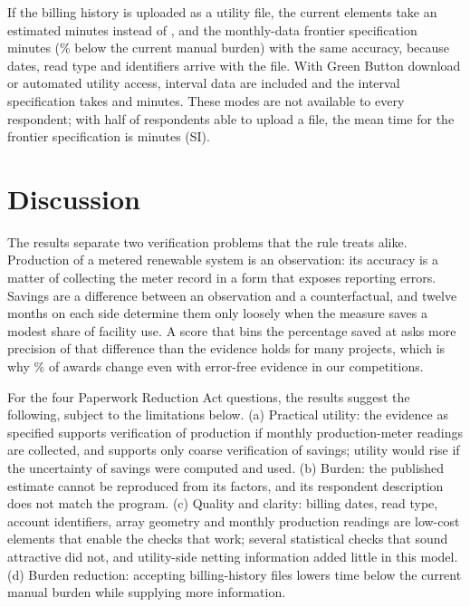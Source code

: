 \documentclass[preprint,12pt]{elsarticle}
\begin{document}
If the billing history is uploaded as a utility file, the current elements take an
estimated \ModeCurrentUploadBurden{} minutes instead of \ModeCurrentManualBurden, and the
monthly-data frontier specification \ModeRecUploadBurden{} minutes
(\ModeRecUploadVsCurrentPct\% below the current manual burden) with the same accuracy,
because dates, read type and identifiers arrive with the file. With Green Button
download \cite{naesbreq21espi} or automated utility access, interval data are included
and the interval specification takes \ModeRecIntervalGreenButtonBurden{} and
\ModeRecIntervalAutomatedBurden{} minutes. These modes are not available to every
respondent; with half of respondents able to upload a file, the mean time for the
frontier specification is \ModeRecUploadHalfBurden{} minutes (SI).

\section{Discussion}

The results separate two verification problems that the rule treats alike. Production of
a metered renewable system is an observation: its accuracy is a matter of collecting the
meter record in a form that exposes reporting errors. Savings are a difference between
an observation and a counterfactual, and twelve months on each side determine them only
loosely when the measure saves a modest share of facility use. A score that bins the
percentage saved at \EeiBandEdges{} asks more precision of that
difference than the evidence holds for many projects, which is why
\SelCurrentCleanMid\% of awards change even with error-free evidence in our competitions.

For the four Paperwork Reduction Act questions, the results suggest the following,
subject to the limitations below. (a) Practical utility: the evidence as specified
supports verification of production if monthly production-meter readings are collected,
and supports only coarse verification of savings; utility would rise if the uncertainty
of savings were computed and used. (b) Burden: the published estimate cannot be
reproduced from its factors, and its respondent description does not match the program.
(c) Quality and clarity: billing dates, read type, account identifiers, array geometry and
monthly production readings are low-cost elements that enable the checks that work;
several statistical checks that sound attractive did not, and utility-side netting
information added little in this model. (d) Burden reduction: accepting billing-history files lowers time below the current
manual burden while supplying more information.
\end{document}
